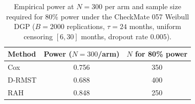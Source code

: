 \begin{table}[ht]
\centering
\caption{Empirical power at $N=300$ per arm and sample size required
  for 80\% power under the CheckMate 057 Weibull DGP ($B=2000$ replications,
  $\tau=24$ months, uniform censoring $[6,30]$ months, dropout rate $0.005$).}
\label{tab:cm057-power-n80}
\begin{tabular}{lcc}
\toprule
Method & Power ($N=300$/arm) & $N$ for 80\% power \\
\midrule
Cox & 0.756 & 350 \\
D-RMST & 0.688 & 400 \\
RAH & 0.848 & 250 \\
\bottomrule
\end{tabular}
\end{table}
